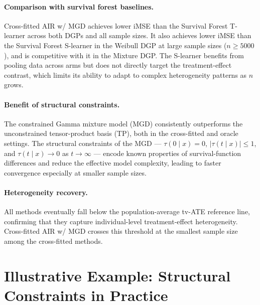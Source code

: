 \documentclass{article}
\begin{document}
\paragraph{Comparison with survival forest baselines.}
Cross-fitted AIR w/ MGD achieves lower iMSE than the Survival Forest T-learner across both DGPs and all sample sizes.
It also achieves lower iMSE than the Survival Forest S-learner in the Weibull DGP at large sample sizes ($n \ge 5000$), and is competitive with it in the Mixture DGP.
The S-learner benefits from pooling data across arms but does not directly target the treatment-effect contrast, which limits its ability to adapt to complex heterogeneity patterns as $n$ grows.

\paragraph{Benefit of structural constraints.}
The constrained Gamma mixture model (MGD) consistently outperforms the unconstrained tensor-product basis (TP), both in the cross-fitted and oracle settings.
The structural constraints of the MGD --- $\tau(0 \mid x) = 0$, $|\tau(t \mid x)| \le 1$, and $\tau(t \mid x) \to 0$ as $t \to \infty$ --- encode known properties of survival-function differences and reduce the effective model complexity, leading to faster convergence especially at smaller sample sizes.

\paragraph{Heterogeneity recovery.}
All methods eventually fall below the population-average tv-ATE reference line, confirming that they capture individual-level treatment-effect heterogeneity.  Cross-fitted AIR w/ MGD crosses this threshold at the smallest sample size among the cross-fitted methods.

\section*{Illustrative Example: Structural Constraints in Practice}
\end{document}
